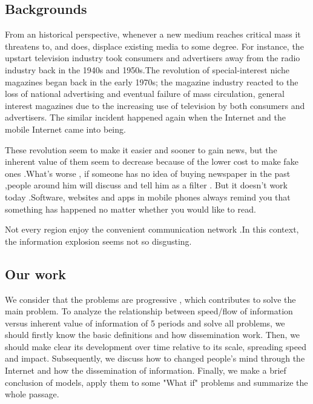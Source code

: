 \subsection{Backgrounds}
\par
From an historical perspective, whenever a new medium reaches critical mass it threatens to, and does, displace existing media to some degree. For instance, the upstart television industry took consumers and advertisers away from the radio industry back in the 1940s and 1950s.The revolution of special-interest niche magazines began back in the early 1970s; the magazine industry reacted to the loss of national advertising and eventual failure of mass circulation, general interest magazines due to the increasing use of television by both consumers and advertisers. The similar incident happened again when the Internet and the mobile Internet came into being.

\par These revolution seem to make it easier and sooner to gain news, but the inherent value of them seem to decrease because of the lower cost to make fake ones .What's worse , if someone has no idea of buying newspaper in the past ,people around him will discuss and tell him as a filter . But it doesn't work today .Software, websites and apps in mobile phones always remind you that something has happened no matter whether you would like to read.

\par Not every region enjoy the convenient communication network .In this context, the information explosion seems not so disgusting.
 \subsection{Our work}

 
 \par We consider that the problems are progressive , which contributes to solve the main problem. To analyze the relationship between speed/flow of information versus inherent value of information of 5 periods and solve all problems, we should firstly know the basic definitions and how dissemination work. Then, we should make clear its development over time relative to its scale, spreading speed and impact. Subsequently, we discuss how to changed people's mind through the Internet and how the dissemination of information. Finally, we make a brief conclusion of models, apply them to some "What if" problems and summarize the whole passage.
 

